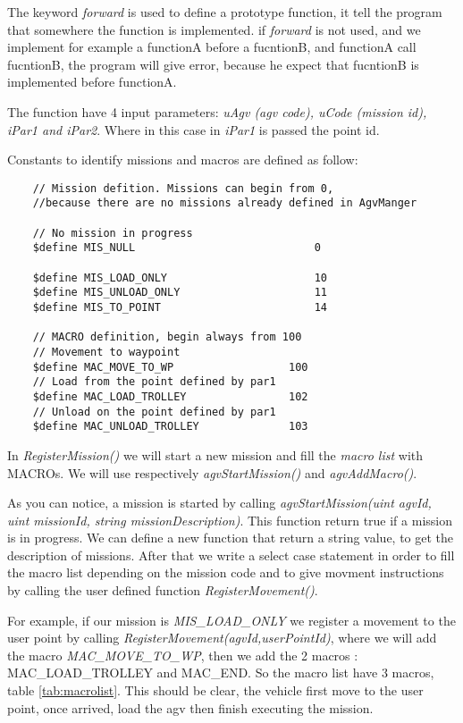 The keyword \textit{forward} is used to define a prototype function, it tell the program that somewhere the function is implemented. if \textit{forward} is not used, and we implement for example a functionA before a fucntionB, and functionA call fucntionB, the program will give error, because he expect that fucntionB is implemented before functionA.

The function have 4 input parameters: \textit{uAgv (agv code), uCode (mission id), iPar1 and iPar2}. Where in this case in \textit{iPar1} is passed the point id.

Constants to identify missions and macros are defined as follow:\\

\begin{lstlisting}
	// Mission defition. Missions can begin from 0, 
	//because there are no missions already defined in AgvManger
	
	// No mission in progress
	$define MIS_NULL							0
	
	$define MIS_LOAD_ONLY						10
	$define MIS_UNLOAD_ONLY						11
	$define MIS_TO_POINT						14
	
	// MACRO definition, begin always from 100
	// Movement to waypoint
	$define MAC_MOVE_TO_WP					100
	// Load from the point defined by par1
	$define MAC_LOAD_TROLLEY				102
	// Unload on the point defined by par1
	$define MAC_UNLOAD_TROLLEY				103
\end{lstlisting}

In \textit{RegisterMission()} we will start a new mission and fill the \textit{macro list} with MACROs. We will use respectively \textit{agvStartMission()} and \textit{agvAddMacro()}.

As you can notice, a mission is started by calling \textit{agvStartMission(uint agvId, uint missionId, string missionDescription)}. This function return true if a mission is in progress. We can define a new function that return a string value, to get the description of missions.
After that we write a select case statement in order to fill the macro list depending on the mission code and to give movment instructions by calling the user defined function \textit{RegisterMovement()}.

For example, if our mission is \textit{MIS\_LOAD\_ONLY}  we register a movement to the user point by calling \textit{RegisterMovement(agvId,userPointId)}, where we will add the macro \textit{MAC\_MOVE\_TO\_WP}, then we add the 2 macros : MAC\_LOAD\_TROLLEY and MAC\_END. So the macro list have 3 macros, table \ref{tab:macrolist}. This should be clear, the vehicle first move to the user point, once arrived, load the agv then finish executing the mission.

